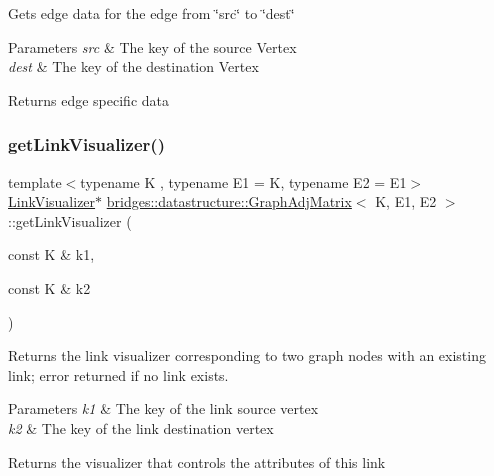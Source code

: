 Gets edge data for the edge from \char`\"{}src\char`\"{} to \char`\"{}dest\char`\"{}


\begin{DoxyParams}{Parameters}
{\em src} & The key of the source Vertex \\
\hline
{\em dest} & The key of the destination Vertex\\
\hline
\end{DoxyParams}
\begin{DoxyReturn}{Returns}
edge specific data 
\end{DoxyReturn}
\mbox{\label{classbridges_1_1datastructure_1_1_graph_adj_matrix_ab41a062af77b11e5cc034f7c21d12421}} 
\subsubsection{\texorpdfstring{get\+Link\+Visualizer()}{getLinkVisualizer()}}
{\footnotesize\ttfamily template$<$typename K , typename E1  = K, typename E2  = E1$>$ \\
\mbox{\hyperlink{classbridges_1_1datastructure_1_1_link_visualizer}{Link\+Visualizer}}$\ast$ \mbox{\hyperlink{classbridges_1_1datastructure_1_1_graph_adj_matrix}{bridges\+::datastructure\+::\+Graph\+Adj\+Matrix}}$<$ K, E1, E2 $>$\+::get\+Link\+Visualizer (\begin{DoxyParamCaption}\item[{const K \&}]{k1,  }\item[{const K \&}]{k2 }\end{DoxyParamCaption})\hspace{0.3cm}{\ttfamily [inline]}}

Returns the link visualizer corresponding to two graph nodes with an existing link; error returned if no link exists.


\begin{DoxyParams}{Parameters}
{\em k1} & The key of the link source vertex \\
\hline
{\em k2} & The key of the link destination vertex\\
\hline
\end{DoxyParams}
\begin{DoxyReturn}{Returns}
the visualizer that controls the attributes of this link 
\end{DoxyReturn}
\mbox{\label{classbridges_1_1datastructure_1_1_graph_adj_matrix_aaf5c1ae5267b7ff4c8fcc861221ff2e8}} 
